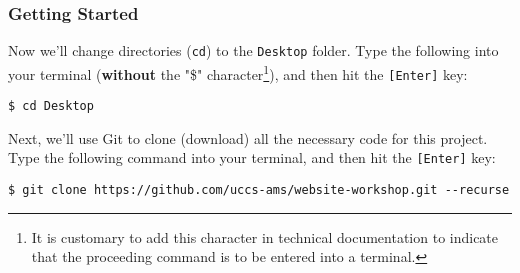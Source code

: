 \begin{frame}[fragile]
    \frametitle{Getting Started}

    Now we'll change directories (\texttt{cd}) to the \texttt{Desktop} folder.  Type the following into your terminal
    (\textbf{without} the "\$" character\footnote{
        It is customary to add this character in technical documentation to indicate that the proceeding
        command is to be entered into a terminal.
    }), and then hit the \texttt{[Enter]} key:
   
    \bigskip
    
    \begin{lstlisting}[style=saneCode,gobble=8]
        $ cd Desktop
    \end{lstlisting}

    \vfill
    Next, we'll use Git to clone (download) all the necessary code for this project. Type the following command into
    your terminal, and then hit the \texttt{[Enter]} key:

    \bigskip

    \begin{lstlisting}[style=saneCode,gobble=8]
        $ git clone https://github.com/uccs-ams/website-workshop.git --recurse
    \end{lstlisting}


\end{frame}
